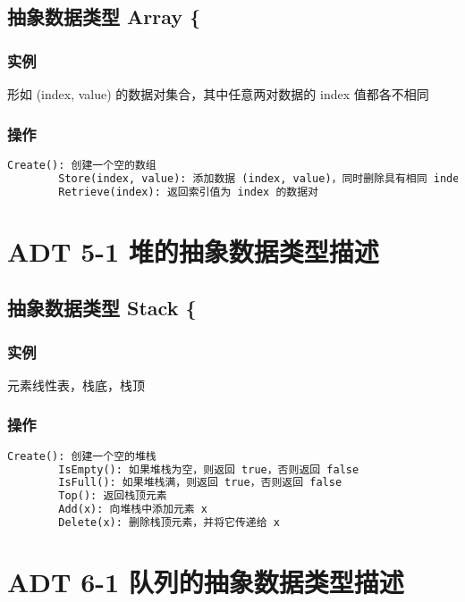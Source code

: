\documentclass[UTF8]{ctexart}
\begin{document}
	\subsection*{抽象数据类型 Array \{}
	
	\subsubsection*{实例}
	形如 (index, value) 的数据对集合，其中任意两对数据的 index 值都各不相同
	
	\subsubsection*{操作}
	\begin{lstlisting}[language=Python, caption={Array ADT}]
		Create(): 创建一个空的数组
		Store(index, value): 添加数据 (index, value)，同时删除具有相同 index 值的数据对（如果存在）
		Retrieve(index): 返回索引值为 index 的数据对
	\end{lstlisting}
	
	\section*{ADT 5-1 堆的抽象数据类型描述}
	
	\subsection*{抽象数据类型 Stack \{}
	
	\subsubsection*{实例}
	元素线性表，栈底，栈顶
	
	\subsubsection*{操作}
	\begin{lstlisting}[language=Python, caption={Stack ADT}]
		Create(): 创建一个空的堆栈
		IsEmpty(): 如果堆栈为空，则返回 true，否则返回 false
		IsFull(): 如果堆栈满，则返回 true，否则返回 false
		Top(): 返回栈顶元素
		Add(x): 向堆栈中添加元素 x
		Delete(x): 删除栈顶元素，并将它传递给 x
	\end{lstlisting}
	
	\section*{ADT 6-1 队列的抽象数据类型描述}
	
\end{document}
